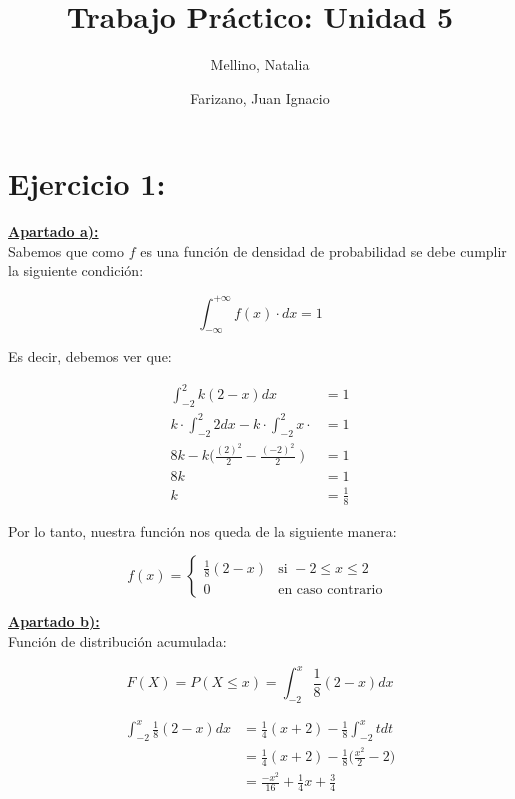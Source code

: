 \documentclass[11pt]{article}
\title{Trabajo Práctico: Unidad 5}
\author{Mellino, Natalia \and Farizano, Juan Ignacio}
\date{}
\begin{document}
\maketitle

\section*{Ejercicio 1:}

\textbf{\underline{Apartado a):}} \\

Sabemos que como $ f $ es una función de densidad de probabilidad se debe cumplir
la siguiente condición:

\begin{equation*}
  \int_{-\infty}^{+\infty} f(x) \cdot dx = 1
\end{equation*}

Es decir, debemos ver que:

\begin{align*}
  \int_{-2}^{2} k(2 - x)dx                                  & = 1           \\
  k \cdot \int_{-2}^{2} 2dx - k \cdot \int_{-2}^{2} x \cdot & = 1           \\
  8k - k \Big(\frac{(2)^2}{2} - \frac{(-2)^2}{2} \; \Big)   & = 1           \\
  8k                                                        & = 1           \\
  k                                                         & = \frac{1}{8}
\end{align*}

Por lo tanto, nuestra función nos queda de la siguiente manera:

\[
  f(x) = \begin{cases}
    \frac{1}{8}(2 - x) & \text{si }  -2 \leq x \leq 2 \\
    0                  & \text{en caso contrario }
  \end{cases}
\]

\textbf{\underline{Apartado b):}} \\

Función de distribución acumulada:

\begin{equation*}
  F(X) = P(X \leq x) = \int_{-2}^{x} \frac{1}{8}(2 - x)dx
\end{equation*}

\begin{align*}
  \int_{-2}^{x} \frac{1}{8}(2 - x)dx & = \frac{1}{4}(x + 2) - \frac{1}{8} \int_{-2}^{x} tdt            \\
                                     & = \frac{1}{4}(x + 2) - \frac{1}{8} \Big(\frac{x^2}{2} - 2 \Big) \\
                                     & = \frac{-x^2}{16} + \frac{1}{4}x + \frac{3}{4}
\end{align*}
\end{document}
